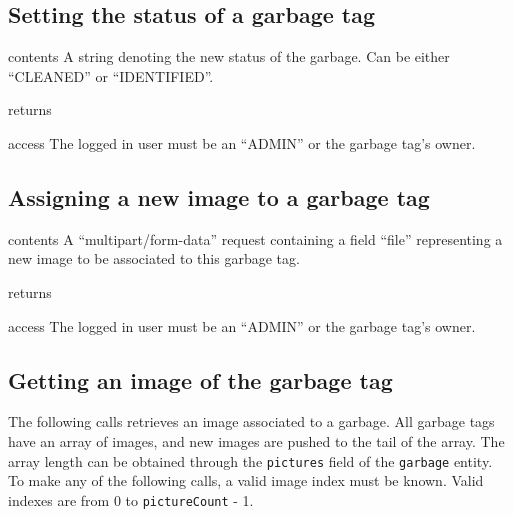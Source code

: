 \subsection{Setting the status of a garbage tag}

\begin{apidata}{contents}
  A string denoting the new status of the garbage. Can be either ``CLEANED'' or
  ``IDENTIFIED''.
\end{apidata}
\begin{apidata}{returns}
  \begin{datalist}
  \end{datalist}
\end{apidata}
\begin{apidata}{access}
The logged in user must be an ``ADMIN'' or the garbage tag's owner.
\end{apidata}


\subsection{Assigning a new image to a garbage tag}

\begin{apidata}{contents}
  A ``multipart/form-data'' request containing a field ``file'' representing a
  new image to be associated to this garbage tag.
\end{apidata}
\begin{apidata}{returns}
  \begin{datalist}
  \end{datalist}
\end{apidata}
\begin{apidata}{access}
The logged in user must be an ``ADMIN'' or the garbage tag's owner.
\end{apidata}


\subsection{Getting an image of the garbage tag}

The following  calls retrieves an image associated to a garbage. All garbage
tags have an array of images, and new images are pushed to the tail of the
array. The array length can be obtained through the \texttt{pictures} field of
the \texttt{garbage} entity.  To make any of the following calls, a valid image
index must be known. Valid indexes are from 0 to \texttt{pictureCount} - 1.

